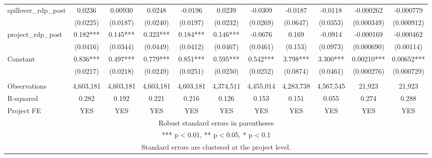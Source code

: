 \begin{tabular}{lcccccccccc}
spillover\_rdp\_post & 0.0236 & 0.00930 & 0.0248 & -0.0196 & 0.0239 & -0.0309 & -0.0187 & -0.0118 & -0.000262 & -0.000779 \\
 & (0.0225) & (0.0187) & (0.0240) & (0.0197) & (0.0232) & (0.0269) & (0.0647) & (0.0353) & (0.000349) & (0.000912) \\
project\_rdp\_post & 0.182*** & 0.145*** & 0.323*** & 0.184*** & 0.146*** & -0.0676 & 0.169 & -0.0914 & -0.000169 & -0.000462 \\
 & (0.0416) & (0.0344) & (0.0449) & (0.0412) & (0.0467) & (0.0461) & (0.153) & (0.0973) & (0.000690) & (0.00114) \\
Constant & 0.836*** & 0.497*** & 0.779*** & 0.851*** & 0.595*** & 0.542*** & 3.798*** & 3.300*** & 0.00210*** & 0.00652*** \\
 & (0.0217) & (0.0218) & (0.0249) & (0.0251) & (0.0250) & (0.0252) & (0.0874) & (0.0461) & (0.000276) & (0.000729) \\
 &  &  &  &  &  &  &  &  &  &  \\
Observations & 4,603,181 & 4,603,181 & 4,603,181 & 4,603,181 & 4,374,511 & 4,455,014 & 4,283,738 & 4,567,545 & 21,923 & 21,923 \\
R-squared & 0.282 & 0.192 & 0.221 & 0.216 & 0.126 & 0.153 & 0.151 & 0.055 & 0.274 & 0.288 \\
 Project FE & YES & YES & YES & YES & YES & YES & YES & YES & YES & YES \\ \hline
\multicolumn{11}{c}{ Robust standard errors in parentheses} \\
\multicolumn{11}{c}{ *** p$<$0.01, ** p$<$0.05, * p$<$0.1} \\
\multicolumn{11}{c}{ Standard errors are clustered at the project level.} \\
\end{tabular}

